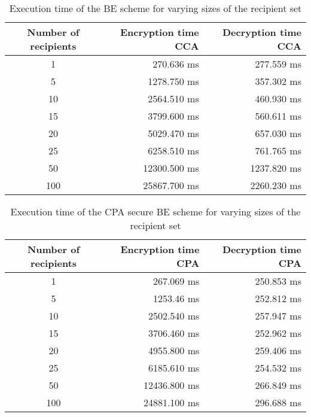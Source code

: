 \documentclass[11pt]{article}
\begin{document}
\begin{table}
\begin{center}
\begin{tabular}{ | c || r | r |}
\hline
  Number of recipients & Encryption time CCA & Decryption time CCA \\ \hline
  1 & 270.636 ms & 277.559 ms \\
  5 & 1278.750 ms & 357.302 ms \\
  10 & 2564.510 ms & 460.930 ms \\
  15 & 3799.600 ms & 560.611 ms \\
  20 & 5029.470 ms & 657.030 ms \\
  25 & 6258.510 ms & 761.765 ms \\
  50 & 12300.500 ms & 1237.820 ms \\
  100 & 25867.700 ms & 2260.230 ms \\ \hline
\end{tabular}
\end{center}
\caption{Execution time of the BE scheme for varying sizes of the recipient set}
\label{table:BE_exec_times}
\end{table}

\begin{table}
\begin{center}
\begin{tabular}{ | c || r | r |}
\hline
  Number of recipients & Encryption time CPA & Decryption time CPA \\ \hline
  1 & 267.069 ms & 250.853 ms \\
  5 & 1253.46 ms & 252.812 ms \\
  10 & 2502.540 ms & 257.947 ms \\
  15 & 3706.460 ms & 252.962 ms \\
  20 & 4955.800 ms & 259.406 ms \\
  25 & 6185.610 ms & 254.532 ms \\
  50 & 12436.800 ms & 266.849 ms \\
  100 & 24881.100 ms & 296.688 ms \\ \hline
\end{tabular}
\end{center}
\caption{Execution time of the CPA secure BE scheme for varying sizes of the recipient set}
\label{table:BE_exec_times_efficient}
\end{table}
\end{document}
